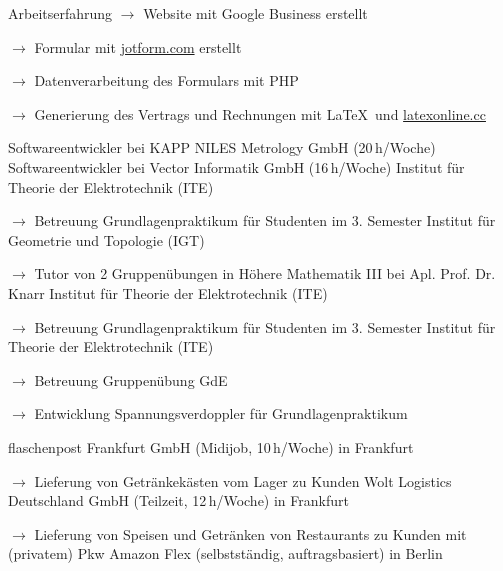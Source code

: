 \begin{rubric}{\textcolor{black!20!blue!100}{Arbeitserfahrung}}
			\setlength{\hangindent}{\widthof{$\rightarrow$ }}
			$\rightarrow$ Website mit Google Business erstellt

			$\rightarrow$ Formular mit \href{https://www.jotform.com/}{jotform.com} erstellt

			$\rightarrow$ Datenverarbeitung des Formulars mit PHP

			$\rightarrow$ Generierung des Vertrags und Rechnungen mit \LaTeX\ und \href{https://latexonline.cc/}{latexonline.cc}
			
		\entry*[10/2024 --- 01/2025]
			Softwareentwickler bei KAPP NILES Metrology GmbH (20\,h/Woche)
		\entry*[05/2016 --- 10/2017]
			Softwareentwickler bei Vector Informatik GmbH (16\,h/Woche)
		\entry*[10/2015 --- 03/2016]
			Institut für Theorie der Elektrotechnik (ITE)
				
			\setlength{\hangindent}{\widthof{$\rightarrow$ }}
			$\rightarrow$ Betreuung Grundlagenpraktikum für Studenten im 3. Semester
		\entry*
			Institut für Geometrie und Topologie (IGT)
			
			\setlength{\hangindent}{\widthof{$\rightarrow$ }}
			$\rightarrow$ Tutor von 2 Gruppenübungen in Höhere Mathematik III bei Apl. Prof. Dr. Knarr
		\entry*[10/2014 --- 03/2015]
			Institut für Theorie der Elektrotechnik (ITE)
			
			\setlength{\hangindent}{\widthof{$\rightarrow$ }}
			$\rightarrow$ Betreuung Grundlagenpraktikum für Studenten im 3. Semester
		\entry*[10/2013 --- 03/2014]
			Institut für Theorie der Elektrotechnik (ITE)
			
			\setlength{\hangindent}{\widthof{$\rightarrow$ }}
			$\rightarrow$ Betreuung Gruppenübung GdE
			
			$\rightarrow$ Entwicklung Spannungsverdoppler für Grundlagenpraktikum
	
		\entry*[23/03/2024 --- 26/04/2024]
			flaschenpost Frankfurt GmbH (Midijob, 10\,h/Woche) in Frankfurt
			
			\setlength{\hangindent}{\widthof{$\rightarrow$ }}
			$\rightarrow$ Lieferung von Getränkekästen vom Lager zu Kunden
		\entry*[06/03/2024 --- 30/04/2024]
			Wolt Logistics Deutschland GmbH (Teilzeit, 12\,h/Woche) in Frankfurt
			
			\setlength{\hangindent}{\widthof{$\rightarrow$ }}
			$\rightarrow$ Lieferung von Speisen und Getränken von Restaurants zu Kunden mit (privatem) Pkw
		\entry*[09/11/2020 --- 06/2022]
			Amazon Flex (selbstständig, auftragsbasiert) in Berlin
			

\end{rubric}
